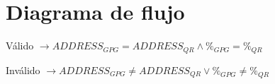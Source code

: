 \documentclass[12pt,a4paper]{article}
\begin{document}
\newpage

\section{Diagrama de flujo}

\begin{center}

\end{center}

Válido $ \rightarrow ADDRESS_{GPG} = ADDRESS_{QR} \wedge \%_{GPG} = \%_{QR} $

Inválido $ \rightarrow ADDRESS_{GPG} \neq ADDRESS_{QR} \vee \%_{GPG} \neq \%_{QR} $




\end{document}
